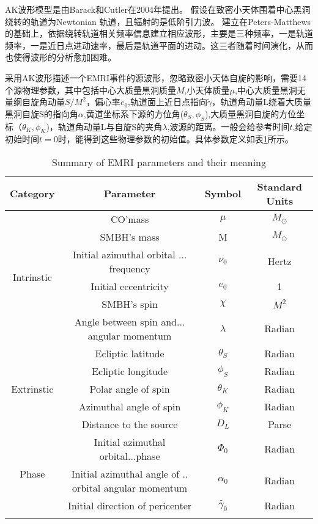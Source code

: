 AK波形模型是由Barack和Cutler在2004年提出。
假设在致密小天体围着中心黑洞绕转的轨道为Newtonian 轨道，且辐射的是低阶引力波。
建立在Peters-Matthews的基础上，依据绕转轨道相关频率信息建立相应波形，主要是三种频率，一是轨道频率，一是近日点进动速率，最后是轨道平面的进动。这三者随着时间演化，从而也使得波形的分析愈加困难。

采用AK波形描述一个EMRI事件的源波形，忽略致密小天体自旋的影响，需要14个源物理参数，其中包括中心大质量黑洞质量$M$,小天体质量$\mu$,中心大质量黑洞无量纲自旋角动量$S/M^2$，偏心率$e_0$,轨道面上近日点指向$\tilde{\gamma}$，轨道角动量L绕着大质量黑洞自旋S的指向角$\alpha$,黄道坐标系下源的方位角($\theta_S,\phi_S$),大质量黑洞自旋的方位坐标（$\theta_K,\phi_K$)，轨道角动量L与自旋S的夹角$\lambda$,波源的距离。一般会给参考时间$t$,给定初始时间$t=0$时，能得到这些物理参数的初始值。具体参数定义如表\ref{table2-p}所示。

\begin{table}[htbp]
\centering
\caption{Summary of EMRI parameters and their meaning}
\begin{tabular}{cccc} %
\hline
Category     & Parameter    & Symbol   & Standard Units  \\
\hline
\multirow{6}{*}{Intrinstic}& CO'mass &$\mu$ &$M_{\odot}$\\
&SMBH's mass   & M      & $M_{\odot}$ \\
&Initial azimuthal orbital ... frequency & $\nu_0$ &Hertz \\
&Initial eccentricity&$e_0$&1 \\
&SMBH's spin &$\chi$&$M^2$ \\
&Angle between spin and... angular momentum&$\lambda$&Radian\\
\hline
\multirow{5}{*}{Extrinstic}& Ecliptic latitude &$\theta_S$ &Radian\\
&Ecliptic longitude&$\phi_S$&Radian \\
&Polar angle of spin&$\theta_K$&Radian \\
&Azimuthal angle of spin&$\phi_K$&Radian \\
&Distance to the source&$D_L$&Parse\\
\hline
\multirow{3}{*}{Phase}&Initial azimuthal orbital...phase&$\Phi_0$&Radian \\
&Initial azimuthal angle of .. orbital angular momentum&$\alpha_0$&Radian \\
&Initial direction of pericenter&$\tilde{\gamma_0}$&Radian  \\ \hline
\label{table2-p}
\end{tabular}
\end{table}



